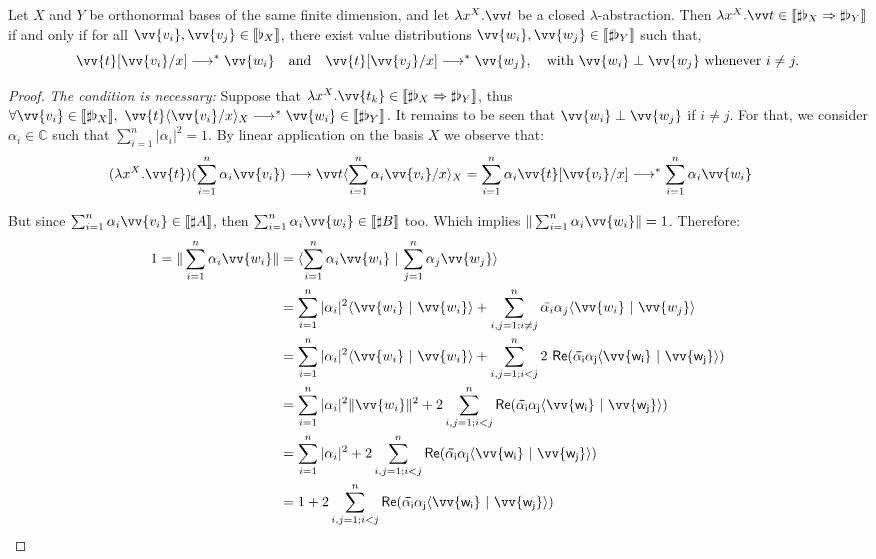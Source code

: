 \documentclass[runningheads,orivec,envcountsame,envcountsect]{llncs}
\newcommand\Rpart[1]{\mathsf{Re(#1)}}
\newcommand\lra{\longrightarrow}
\newcommand\ansubst[2]{\ensuremath{\langle #1 \rangle_{#2}}}
\def\C{\mathbb{C}}            %
\def\scal#1#2{\langle{#1}~|~{#2}\rangle}
\def\Lam#1#2#3{\lambda#1^{#2}{.}#3} %
\def\eval{\lra^*}
\def\Arr{\Rightarrow}
\def\sem#1{\llbracket#1\rrbracket}
\newcommand\basis[1]{\ensuremath{\flat_{#1}}}
\begin{document}
\begin{restatelemma}
  Let $X$ and $Y$ be orthonormal bases of the same finite
  dimension, and let $\Lam{x}{{X}}{\vv t}$ be a closed $\lambda$-abstraction.
  Then $\Lam{x}{{X}}{\vv t}\in\sem{\sharp\basis{X}\Arr\sharp\basis{Y}}$
  if and only if 
  for all $\vv{v_i},\vv{v_j}\in\sem{\basis{X}}$,
  there exist value distributions
  $\vv{w_i},\vv{w_j}\in\sem{\sharp\basis{Y}}$ such that,
  \[
    \vv{t}[\vv{v_i}/x]\eval\vv{w_i}
    \quad\text{and}\quad
    \vv{t}[\vv{v_j}/x]\eval\vv{w_j},
    \quad\text{with } 
    \vv{w_i}\perp\vv{w_j}\text{ whenever }i\neq j.
  \]
\end{restatelemma}
\begin{proof}
  \textit{The condition is necessary:} Suppose that $\Lam{x}{{X}}{\vv{t_k}}\in\sem{\sharp\basis{X}\Arr\sharp\basis{Y}}$, thus $\forall \vv{v_i}\in\sem{\sharp\basis{X}},\ \vv{t}\ansubst{\vv{v_i}/x}{X}\eval\vv{w_i}\in\sem{\sharp\basis{Y}}$. It remains to be seen that $\vv{w_i} \perp \vv{w_j}$ if $i\neq j$. For that, we consider $\alpha_i\in\C$ such that $\sum_{i=1}^n |\alpha_i|^2 = 1$. By linear application on the basis $X$ we observe that:
  \begin{align*}
    (\Lam{x}{{X}}{\vv{t}})(\sum_{i=1}^n \alpha_i \vv{v_i}) &\lra \vv t\ansubst{\sum_{i=1}^n \alpha_i \vv{v_i}/x}{X}
    = \sum_{i=1}^{n} \alpha_i \vv{t}[\vv{v_i}/x] 
    \eval \sum_{i=1}^n \alpha_i \vv{w_i}
  \end{align*}

  But since $\sum_{i=1}^n \alpha_i \vv{v_i}\in\sem{\sharp A}$, then $\sum_{i=1}^n \alpha_i \vv{w_i}\in\sem{\sharp B}$ too. Which implies $\|\sum_{i=1}^n \alpha_i \vv{w_i}\|=1$. Therefore:
  \begin{align*}
    1 = \|\sum_{i=1}^n \alpha_i \vv{w_i}\| &= \scal{\sum_{i=1}^n \alpha_i \vv{w_i}}{\sum_{j=1}^n \alpha_j \vv{w_j}}\\
    &=\sum_{i=1}^n |\alpha_i|^2 \scal{\vv{w_i}}{\vv{w_i} } + \sum_{i,j=1; i\neq j}^n \bar{\alpha_i}\alpha_j \scal{\vv{w_i}}{\vv{w_j}}\\
    &=\sum_{i=1}^n |\alpha_i|^2 \scal{\vv{w_i}}{\vv{w_i} } + \sum_{i,j=1; i<j}^n 2~\Rpart{\bar{\alpha_i}\alpha_j \scal{\vv{w_i}}{\vv{w_j}}}\\
    &=\sum_{i=1}^n |\alpha_i|^2 \|\vv{w_i}\|^2 + 2\sum_{i,j=1; i<j}^n \Rpart{\bar{\alpha_i}\alpha_j \scal{\vv{w_i}}{\vv{w_j}}}\\
    &=\sum_{i=1}^n |\alpha_i|^2 + 2\sum_{i,j=1; i<j}^n\Rpart{\bar{\alpha_i}\alpha_j \scal{\vv{w_i}}{\vv{w_j}}}\\
    &= 1 + 2\sum_{i,j=1; i<j}^n \Rpart{\bar{\alpha_i}\alpha_j \scal{\vv{w_i}}{\vv{w_j}}}
  \end{align*}


\end{proof}
\end{document}
